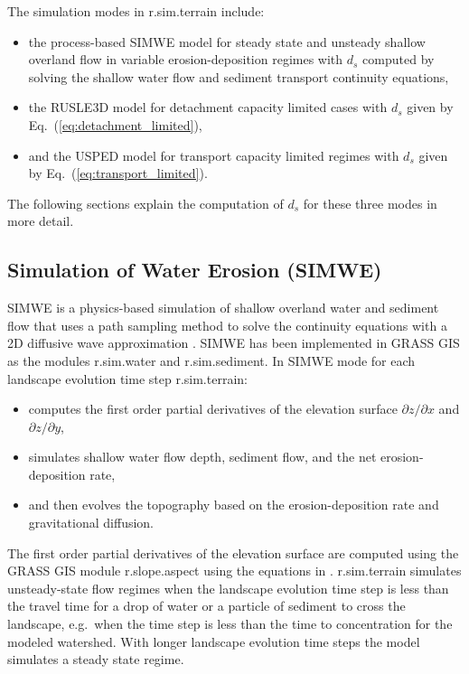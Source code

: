 \documentclass[gmd, manuscript]{copernicus}
\begin{document}
The simulation modes in r.sim.terrain include:
\begin{itemize}
  \item the process-based SIMWE model 
  for steady state and unsteady shallow overland flow 
  in variable erosion-deposition regimes
  with $d_s$ computed by solving the shallow water flow 
  and sediment transport continuity equations,
  \item the RUSLE3D model for detachment capacity limited cases
  with $d_s$ given by Eq.~(\ref{eq:detachment_limited}),
  \item and the USPED model for transport capacity limited regimes
  with $d_s$ given by Eq.~(\ref{eq:transport_limited}).
\end{itemize}

\noindent The following sections explain the computation of $d_s$ for these three modes in more detail.

\subsection{Simulation of Water Erosion (SIMWE)} \label{simwe}
SIMWE is a physics-based simulation of shallow overland water and sediment flow
that uses a path sampling method to solve the continuity equations 
with a 2D diffusive wave approximation 
\citep{Mitas1998,Mitasova2004}.
SIMWE has been implemented in GRASS GIS as the modules 
r.sim.water
and r.sim.sediment. 
In SIMWE mode for each landscape evolution time step
r.sim.terrain:
\begin{itemize}
\item computes the first order partial derivatives of the elevation surface
$\partial z / \partial x$ and $\partial z / \partial y$,
\item simulates shallow water flow depth, sediment flow, and the net erosion-deposition rate, 
\item and then evolves the topography based on the erosion-deposition rate and gravitational diffusion. 
\end{itemize}
%
The first order partial derivatives of the elevation surface
are computed using the GRASS GIS module r.slope.aspect 
using the equations in \cite{Hofierka2009}.
r.sim.terrain simulates unsteady-state flow regimes
when the landscape evolution time step is less than the travel time 
for a drop of water or a particle of sediment to cross the landscape,
e.g.~when the time step is less than the time to concentration for the modeled watershed.
With longer landscape evolution time steps the model simulates a steady state regime. 
\end{document}
